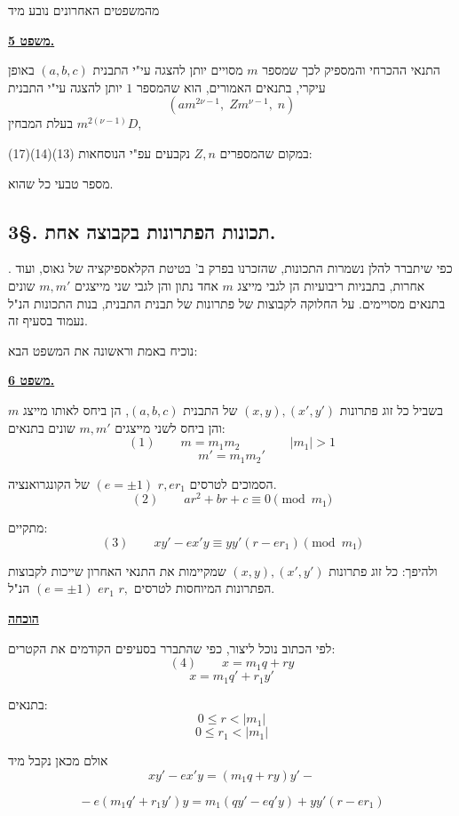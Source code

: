 \noindent מהמשפטים האחרונים נובע מיד

\bigskip
\noindent\textbf{\underline{משפט 5.}}

\noindent התנאי ההכרחי והמספיק לכך שמספר $m$ מסויים יותן להצגה
עי"י התבנית $(a,b,c)$ באופן עיקרי, בתנאים האמורים, הוא
שהמספר $1$ יותן להצגה עי"י התבנית
\[ \left(am^{2\nu-1},\; Zm^{\nu-1},\; n\right) \]
בעלת המבחין $m^{2(\nu-1)}D$,

\noindent במקום שהמספרים $Z, n$ נקבעים עפ"י הנוסחאות (13)(14)(17):

\noindent מספר טבעי כל שהוא.

\subsection*{3\S. תכונות הפתרונות בקבוצה אחת.}

. כפי שיתברר להלן נשמרות התכונות, שהזכרנו בפרק ב' בטיטת
הקלאספיקציה של גאוס, ועוד אחרות, בתבניות ריבועיות הן לגבי
מייצג $m$ אחד נתון והן לגבי שני מייצגים $m, m'$ שונים בתנאים
מסויימים. על החלוקה לקבוצות של פתרונות של תבנית התבנית, בנות
התכונות הנ"ל נעמוד בסעיף זה.

\noindent נוכיח באמת וראשונה את המשפט הבא:

\bigskip
\noindent\textbf{\underline{משפט 6.}}

\noindent בשביל כל זוג פתרונות $(x,y), (x',y')$ של התבנית
$(a,b,c)$, הן ביחס לאותו מייצג $m$ והן ביחס לשני
מייצגים $m, m'$ שונים בתנאים:
\[ (1) \qquad m = m_1 m_2 \qquad\qquad |m_1| > 1 \]
\[ m' = m_1 m_2' \]

\noindent הסמוכים לטרסים $r, er_1$ $(e = \pm 1)$ של הקונגרואנציה.
\[ (2) \qquad ar^2 + br + c \equiv 0 \pmod{m_1} \]

\noindent מתקיים:
\[ (3) \qquad xy' - ex'y \equiv yy'(r - er_1) \pmod{m_1} \]

\noindent ולהיפך: כל זוג פתרונות $(x,y), (x',y')$ שמקיימות את התנאי
האחרון שייכות לקבוצות הפתרונות המיוחסות לטרסים $r,$
$er_1$ $(e=\pm 1)$ הנ"ל.

\bigskip
\noindent\textbf{\underline{הוכחה}}

\noindent לפי הכתוב נוכל ליצור, כפי שהתברר בסעיפים הקודמים את
הקטרים:
\[ (4) \qquad x = m_1 q + ry \]
\[ x = m_1 q' + r_1 y' \]

\noindent בתנאים:
\[ 0 \le r < |m_1| \]
\[ 0 \le r_1 < |m_1| \]

\noindent אולם מכאן נקבל מיד
\[ xy' - ex'y = (m_1 q + ry)y' - {} \]

\[ {} - e(m_1 q' + r_1 y')y = m_1(qy' - eq'y) + yy'(r - er_1) \]

